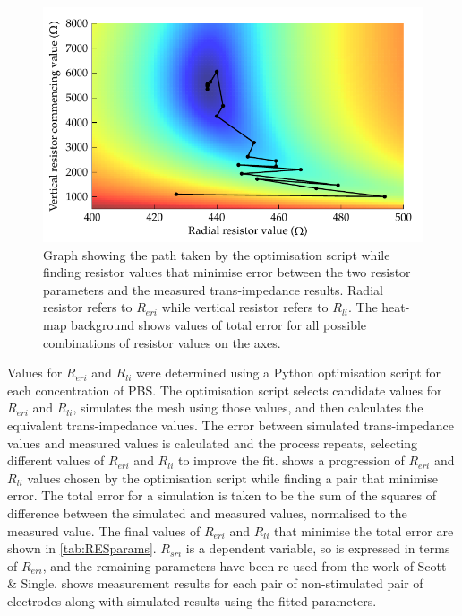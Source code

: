       \begin{figure}[ht]
        \centering
        \includegraphics{content/pt2/07-InterfaceModel/graphics/graph_optimisation_transimpedance}
        \caption{\label{fig:pt2-graph_transimpedance_optimisation}Graph showing the path taken by the optimisation script while finding resistor values that minimise error between the two resistor parameters and the measured trans-impedance results. Radial resistor refers to $R_{eri}$ while vertical resistor refers to $R_{li}$. The heat-map background shows values of total error for all possible combinations of resistor values on the axes.}
      \end{figure}
      Values for $R_{eri}$ and $R_{li}$ were determined using a Python optimisation script for each concentration of PBS.
      The optimisation script selects candidate values for $R_{eri}$ and $R_{li}$, simulates the mesh using those values, and then calculates the equivalent trans-impedance values.
      The error between simulated trans-impedance values and measured values is calculated and the process repeats, selecting different values of $R_{eri}$ and $R_{li}$ to improve the fit.
       shows a progression of $R_{eri}$ and $R_{li}$ values chosen by the optimisation script while finding a pair that minimise error.
      The total error for a simulation is taken to be the sum of the squares of difference between the simulated and measured values, normalised to the measured value.
      The final values of $R_{eri}$ and $R_{li}$ that minimise the total error are shown in \cref{tab:RESparams}.
      $R_{sri}$ is a dependent variable, so is expressed in terms of $R_{eri}$, and the remaining parameters have been re-used from the work of Scott \& Single.
       shows measurement results for each pair of non-stimulated pair of electrodes along with simulated results using the fitted parameters.


